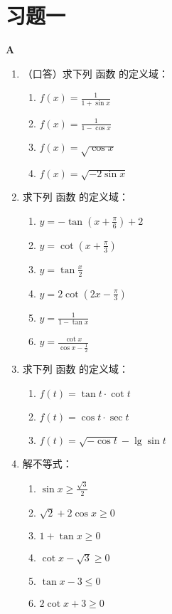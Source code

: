 \section*{习题一}
\begin{center}
    \bfseries A
\end{center}

\begin{enumerate}
    \item （口答）求下列 函数 的定义域：
\begin{multicols}{2}
\begin{enumerate}[(1)]
    \item $f(x)=\frac{1}{1+\sin x}$
    \item $f(x)=\frac{1}{1-\cos x}$
    \item $f(x)=\sqrt{\cos x}$
    \item $f(x)=\sqrt{-2\sin x}$
\end{enumerate}
\end{multicols}
\item 求下列 函数 的定义域：
\begin{multicols}{2}
\begin{enumerate}[(1)]
    \item $y=-\tan\left(x+\frac{\pi}{6}\right)+2$
    \item $y=\cot\left(x+\frac{\pi}{3}\right)$
    \item $y=\tan\frac{x}{2}$
    \item $y=2\cot\left(2x-\frac{\pi}{3}\right)$
    \item $y=\frac{1}{1-\tan x}$
    \item $y=\frac{\cot x}{\cos x -\frac{1}{2}}$
\end{enumerate}
\end{multicols}
\item 求下列 函数 的定义域：
\begin{multicols}{2}
\begin{enumerate}[(1)]
\item $f(t)=\tan t\cdot \cot t$
\item $f(t)=\cos t\cdot \sec t$
\item $f(t)=\sqrt{-\cos t}-\lg\sin t$
\end{enumerate}
\end{multicols}

\item 解不等式：
\begin{multicols}{2}
\begin{enumerate}[(1)]
    \item $\sin x\ge \frac{\sqrt{3}}{2}$
    \item $\sqrt{2}+2\cos x\ge 0$
    \item $1+\tan x\ge 0$
    \item $\cot x-\sqrt{3}\ge 0$
    \item $\tan x-3\le 0$
    \item $2\cot x+3\ge 0$
\end{enumerate}
\end{multicols}


\end{enumerate}
